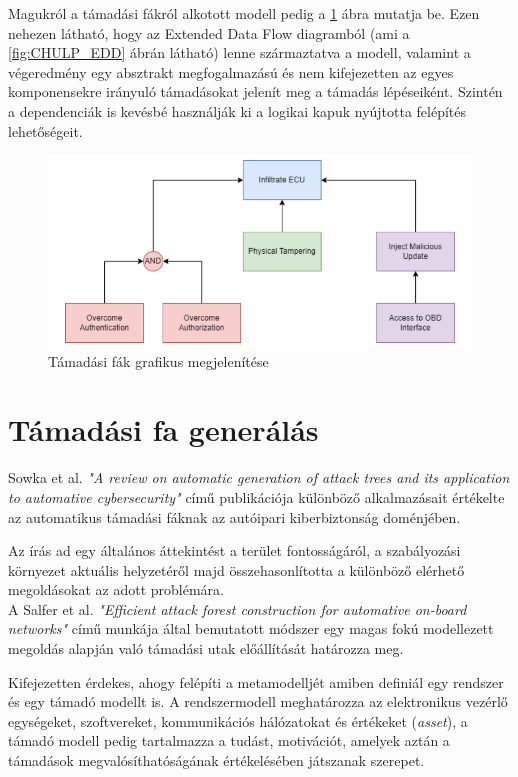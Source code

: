Magukról a támadási fákról alkotott modell pedig a \ref{fig:CHULP_AT} ábra mutatja be. Ezen nehezen látható, hogy az Extended Data Flow diagramból (ami a \ref{fig:CHULP_EDD} ábrán látható) lenne származtatva a modell, valamint a végeredmény egy absztrakt megfogalmazású és nem kifejezetten az egyes komponensekre irányuló támadásokat jelenít meg a támadás lépéseiként. Szintén a dependenciák is kevésbé használják ki a logikai kapuk nyújtotta felépítés lehetőségeit.

\begin{figure}[!ht]
	\centering
	\includegraphics[width=125mm, keepaspectratio]{figures/03_CHULP_AT.png}
	\caption{Támadási fák grafikus megjelenítése\cite{Chulp}}
	\label{fig:CHULP_AT}
\end{figure}

\section{Támadási fa generálás}

Sowka et al.\cite{Sowka} \textit{"A review on automatic generation of attack trees and its application to automative cybersecurity"} című publikációja különböző alkalmazásait értékelte az automatikus támadási fáknak az autóipari kiberbiztonság doménjében. 

Az írás ad egy általános áttekintést a terület fontosságáról, a szabályozási környezet aktuális helyzetéről majd összehasonlította a különböző elérhető megoldásokat az adott problémára.\\

A Salfer et al.\cite{Salfer} \textit{"Efficient attack forest construction for automative on-board networks"} című munkája által bemutatott módszer egy magas fokú modellezett megoldás alapján való támadási utak előállítását határozza meg. 

Kifejezetten érdekes, ahogy felépíti a metamodelljét amiben definiál egy rendszer és egy támadó modellt is. A rendszermodell meghatározza az elektronikus vezérlő egységeket, szoftvereket, kommunikációs hálózatokat és értékeket (\textit{asset}), a támadó modell pedig tartalmazza a tudást, motivációt, amelyek aztán a támadások megvalósíthatóságának értékelésében játszanak szerepet. 

